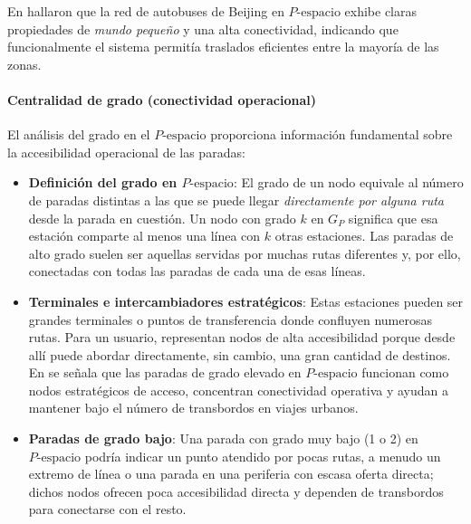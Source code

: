                 En \cite{zhang2019} hallaron que la red de autobuses de Beijing en $P\text{-espacio}$ exhibe claras propiedades de \textit{mundo pequeño} y una alta conectividad, indicando que funcionalmente el sistema permitía traslados eficientes entre la mayoría de las zonas.

            \paragraph{Centralidad de grado (conectividad operacional)}
            El análisis del grado en el $P\text{-espacio}$ proporciona información fundamental sobre la accesibilidad operacional de las paradas:

            \begin{itemize}
                    \item \textbf{Definición del grado en $P\text{-espacio}$}: El grado de un nodo equivale al número de paradas distintas a las que se puede llegar \textit{directamente por alguna ruta} desde la parada en cuestión. Un nodo con grado $k$ en $G_P$ significa que esa estación comparte al menos una línea con $k$ otras estaciones. Las paradas de alto grado suelen ser aquellas servidas por muchas rutas diferentes y, por ello, conectadas con todas las paradas de cada una de esas líneas.

                \item \textbf{Terminales e intercambiadores estratégicos}: Estas estaciones pueden ser grandes terminales o puntos de transferencia donde confluyen numerosas rutas. Para un usuario, representan nodos de alta accesibilidad porque desde allí puede abordar directamente, sin cambio, una gran cantidad de destinos. En \cite{dingluo2019} se señala que las paradas de grado elevado en $P\text{-espacio}$ funcionan como nodos estratégicos de acceso, concentran conectividad operativa y ayudan a mantener bajo el número de transbordos en viajes urbanos.

                \item \textbf{Paradas de grado bajo}: Una parada con grado muy bajo (1 o 2) en $P\text{-espacio}$ podría indicar un punto atendido por pocas rutas, a menudo un extremo de línea o una parada en una periferia con escasa oferta directa; dichos nodos ofrecen poca accesibilidad directa y dependen de transbordos para conectarse con el resto.
            \end{itemize}

